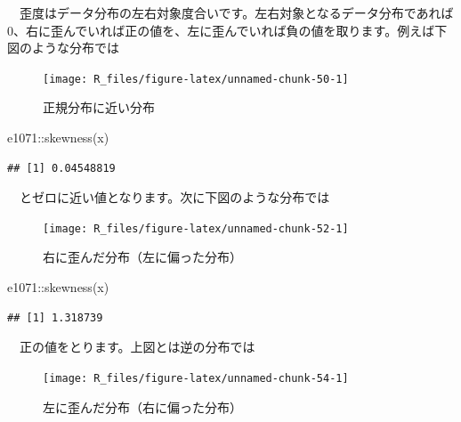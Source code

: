 \documentclass[
  12pt,
]{book}
\newenvironment{Shaded}{\begin{snugshade}}{\end{snugshade}}
\newcommand{\FunctionTok}[1]{\textcolor[rgb]{0.00,0.00,0.00}{#1}}
\newcommand{\NormalTok}[1]{#1}
\newcommand{\SpecialCharTok}[1]{\textcolor[rgb]{0.00,0.00,0.00}{#1}}
\begin{document}
　歪度はデータ分布の左右対象度合いです。左右対象となるデータ分布であれば\(0\)、右に歪んでいれば正の値を、左に歪んでいれば負の値を取ります。例えば下図のような分布では

\begin{figure}[H]

{\centering \texttt{[image: R\_files/figure-latex/unnamed-chunk-50-1]} 

}

\caption{正規分布に近い分布}\label{fig:unnamed-chunk-50}
\end{figure}

\begin{Shaded}
\begin{Highlighting}[numbers=left,,]
\NormalTok{e1071}\SpecialCharTok{::}\FunctionTok{skewness}\NormalTok{(x)}
\end{Highlighting}
\end{Shaded}

\begin{verbatim}
## [1] 0.04548819
\end{verbatim}

　とゼロに近い値となります。次に下図のような分布では

\begin{figure}[H]

{\centering \texttt{[image: R\_files/figure-latex/unnamed-chunk-52-1]} 

}

\caption{右に歪んだ分布（左に偏った分布）}\label{fig:unnamed-chunk-52}
\end{figure}

\begin{Shaded}
\begin{Highlighting}[numbers=left,,]
\NormalTok{e1071}\SpecialCharTok{::}\FunctionTok{skewness}\NormalTok{(x)}
\end{Highlighting}
\end{Shaded}

\begin{verbatim}
## [1] 1.318739
\end{verbatim}

　正の値をとります。上図とは逆の分布では

\begin{figure}[H]

{\centering \texttt{[image: R\_files/figure-latex/unnamed-chunk-54-1]} 

}

\caption{左に歪んだ分布（右に偏った分布）}\label{fig:unnamed-chunk-54}
\end{figure}
\end{document}

